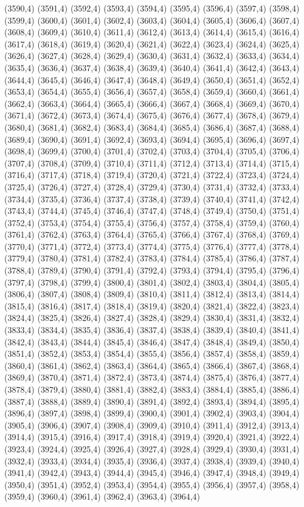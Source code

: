 (3590,4)
(3591,4)
(3592,4)
(3593,4)
(3594,4)
(3595,4)
(3596,4)
(3597,4)
(3598,4)
(3599,4)
(3600,4)
(3601,4)
(3602,4)
(3603,4)
(3604,4)
(3605,4)
(3606,4)
(3607,4)
(3608,4)
(3609,4)
(3610,4)
(3611,4)
(3612,4)
(3613,4)
(3614,4)
(3615,4)
(3616,4)
(3617,4)
(3618,4)
(3619,4)
(3620,4)
(3621,4)
(3622,4)
(3623,4)
(3624,4)
(3625,4)
(3626,4)
(3627,4)
(3628,4)
(3629,4)
(3630,4)
(3631,4)
(3632,4)
(3633,4)
(3634,4)
(3635,4)
(3636,4)
(3637,4)
(3638,4)
(3639,4)
(3640,4)
(3641,4)
(3642,4)
(3643,4)
(3644,4)
(3645,4)
(3646,4)
(3647,4)
(3648,4)
(3649,4)
(3650,4)
(3651,4)
(3652,4)
(3653,4)
(3654,4)
(3655,4)
(3656,4)
(3657,4)
(3658,4)
(3659,4)
(3660,4)
(3661,4)
(3662,4)
(3663,4)
(3664,4)
(3665,4)
(3666,4)
(3667,4)
(3668,4)
(3669,4)
(3670,4)
(3671,4)
(3672,4)
(3673,4)
(3674,4)
(3675,4)
(3676,4)
(3677,4)
(3678,4)
(3679,4)
(3680,4)
(3681,4)
(3682,4)
(3683,4)
(3684,4)
(3685,4)
(3686,4)
(3687,4)
(3688,4)
(3689,4)
(3690,4)
(3691,4)
(3692,4)
(3693,4)
(3694,4)
(3695,4)
(3696,4)
(3697,4)
(3698,4)
(3699,4)
(3700,4)
(3701,4)
(3702,4)
(3703,4)
(3704,4)
(3705,4)
(3706,4)
(3707,4)
(3708,4)
(3709,4)
(3710,4)
(3711,4)
(3712,4)
(3713,4)
(3714,4)
(3715,4)
(3716,4)
(3717,4)
(3718,4)
(3719,4)
(3720,4)
(3721,4)
(3722,4)
(3723,4)
(3724,4)
(3725,4)
(3726,4)
(3727,4)
(3728,4)
(3729,4)
(3730,4)
(3731,4)
(3732,4)
(3733,4)
(3734,4)
(3735,4)
(3736,4)
(3737,4)
(3738,4)
(3739,4)
(3740,4)
(3741,4)
(3742,4)
(3743,4)
(3744,4)
(3745,4)
(3746,4)
(3747,4)
(3748,4)
(3749,4)
(3750,4)
(3751,4)
(3752,4)
(3753,4)
(3754,4)
(3755,4)
(3756,4)
(3757,4)
(3758,4)
(3759,4)
(3760,4)
(3761,4)
(3762,4)
(3763,4)
(3764,4)
(3765,4)
(3766,4)
(3767,4)
(3768,4)
(3769,4)
(3770,4)
(3771,4)
(3772,4)
(3773,4)
(3774,4)
(3775,4)
(3776,4)
(3777,4)
(3778,4)
(3779,4)
(3780,4)
(3781,4)
(3782,4)
(3783,4)
(3784,4)
(3785,4)
(3786,4)
(3787,4)
(3788,4)
(3789,4)
(3790,4)
(3791,4)
(3792,4)
(3793,4)
(3794,4)
(3795,4)
(3796,4)
(3797,4)
(3798,4)
(3799,4)
(3800,4)
(3801,4)
(3802,4)
(3803,4)
(3804,4)
(3805,4)
(3806,4)
(3807,4)
(3808,4)
(3809,4)
(3810,4)
(3811,4)
(3812,4)
(3813,4)
(3814,4)
(3815,4)
(3816,4)
(3817,4)
(3818,4)
(3819,4)
(3820,4)
(3821,4)
(3822,4)
(3823,4)
(3824,4)
(3825,4)
(3826,4)
(3827,4)
(3828,4)
(3829,4)
(3830,4)
(3831,4)
(3832,4)
(3833,4)
(3834,4)
(3835,4)
(3836,4)
(3837,4)
(3838,4)
(3839,4)
(3840,4)
(3841,4)
(3842,4)
(3843,4)
(3844,4)
(3845,4)
(3846,4)
(3847,4)
(3848,4)
(3849,4)
(3850,4)
(3851,4)
(3852,4)
(3853,4)
(3854,4)
(3855,4)
(3856,4)
(3857,4)
(3858,4)
(3859,4)
(3860,4)
(3861,4)
(3862,4)
(3863,4)
(3864,4)
(3865,4)
(3866,4)
(3867,4)
(3868,4)
(3869,4)
(3870,4)
(3871,4)
(3872,4)
(3873,4)
(3874,4)
(3875,4)
(3876,4)
(3877,4)
(3878,4)
(3879,4)
(3880,4)
(3881,4)
(3882,4)
(3883,4)
(3884,4)
(3885,4)
(3886,4)
(3887,4)
(3888,4)
(3889,4)
(3890,4)
(3891,4)
(3892,4)
(3893,4)
(3894,4)
(3895,4)
(3896,4)
(3897,4)
(3898,4)
(3899,4)
(3900,4)
(3901,4)
(3902,4)
(3903,4)
(3904,4)
(3905,4)
(3906,4)
(3907,4)
(3908,4)
(3909,4)
(3910,4)
(3911,4)
(3912,4)
(3913,4)
(3914,4)
(3915,4)
(3916,4)
(3917,4)
(3918,4)
(3919,4)
(3920,4)
(3921,4)
(3922,4)
(3923,4)
(3924,4)
(3925,4)
(3926,4)
(3927,4)
(3928,4)
(3929,4)
(3930,4)
(3931,4)
(3932,4)
(3933,4)
(3934,4)
(3935,4)
(3936,4)
(3937,4)
(3938,4)
(3939,4)
(3940,4)
(3941,4)
(3942,4)
(3943,4)
(3944,4)
(3945,4)
(3946,4)
(3947,4)
(3948,4)
(3949,4)
(3950,4)
(3951,4)
(3952,4)
(3953,4)
(3954,4)
(3955,4)
(3956,4)
(3957,4)
(3958,4)
(3959,4)
(3960,4)
(3961,4)
(3962,4)
(3963,4)
(3964,4)